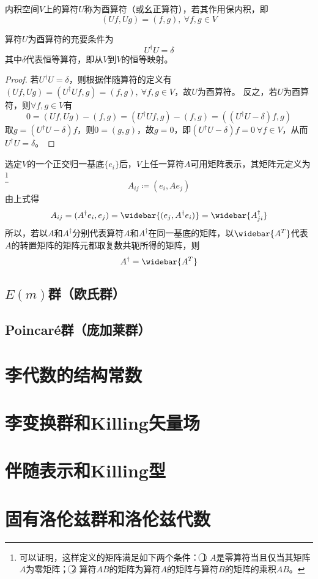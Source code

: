 \begin{definition}
    内积空间$V$上的算符$U$称为酉算符（或幺正算符），若其作用保内积，即
    $$(Uf, Ug) = (f, g), ~ \forall f, g \in V$$
\end{definition}

\begin{theorem}
    算符$U$为酉算符的充要条件为
    $$U^\dagger U = \delta$$
    其中$\delta$代表恒等算符，即从$V$到$V$的恒等映射。
\end{theorem}

\begin{proof}
    若$U^\dagger U = \delta$，则根据伴随算符的定义有$(Uf, Ug) = (U^\dagger Uf, g) = (f, g), ~ \forall f, g \in V$，故$U$为酉算符。
    反之，若$U$为酉算符，则$\forall f, g \in V$有
    $$0 = (Uf, Ug) - (f, g) = (U^\dagger Uf, g) - (f, g) = ((U^\dagger U - \delta)f, g)$$
    取$g = (U^\dagger U - \delta)f$，则$0 = (g, g)$，故$g = 0$，即$(U^\dagger U - \delta)f = 0 ~ \forall f \in V$，从而$U^\dagger U = \delta$。
\end{proof}

选定$V$的一个正交归一基底$\{e_i\}$后，$V$上任一算符$A$可用矩阵表示，其矩阵元定义为\footnote{
可以证明，这样定义的矩阵满足如下两个条件：
\textcircled{1} $A$是零算符当且仅当其矩阵$A$为零矩阵；
\textcircled{2} 算符$AB$的矩阵为算符$A$的矩阵与算符$B$的矩阵的乘积$AB$。
}
$$A_{ij} \coloneq (e_i, Ae_j)$$
由上式得
$$A_{ij} = (A^\dagger e_i, e_j) = \widebar{(e_j, A^\dagger e_i)} = \widebar{A^\dagger_{ji}}$$
所以，若以$A$和$A^\dagger$分别代表算符$A$和$A^\dagger$在同一基底的矩阵，以$\widebar{A^T}$代表$A$的转置矩阵的矩阵元都取复数共轭所得的矩阵，则
$$A^\dagger = \widebar{A^T}$$

\subsection{$E(m)$群（欧氏群）}

\subsection{Poincaré群（庞加莱群）}

\section{李代数的结构常数}

\section{李变换群和Killing矢量场}

\section{伴随表示和Killing型}

\section{固有洛伦兹群和洛伦兹代数}

